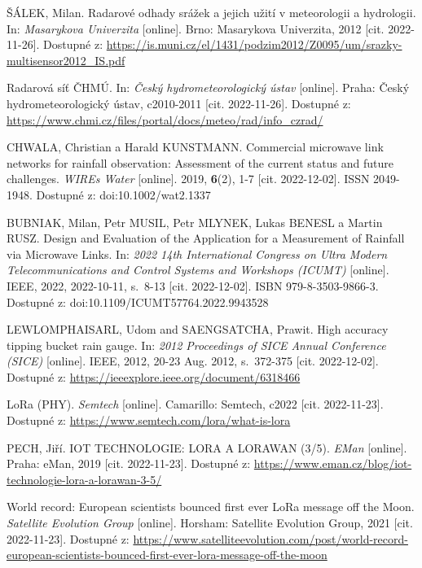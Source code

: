 \begin{thebibliography}{99}
ŠÁLEK, Milan. Radarové odhady srážek a jejich užití v meteorologii a hydrologii. In: \textit{Masarykova Univerzita} [online]. Brno: Masarykova Univerzita, 2012 [cit. 2022-11-26]. Dostupné z: \url{https://is.muni.cz/el/1431/podzim2012/Z0095/um/srazky-multisensor2012\_IS.pdf}

Radarová síť ČHMÚ. In: \textit{Český hydrometeorologický ústav} [online]. Praha: Český hydrometeorologický ústav, c2010-2011 [cit. 2022-11-26]. Dostupné z: \url{https://www.chmi.cz/files/portal/docs/meteo/rad/info\_czrad/}

CHWALA, Christian a Harald KUNSTMANN. Commercial microwave link networks for rainfall observation: Assessment of the current status and future challenges. \textit{WIREs Water} [online]. 2019, \textbf{6}(2), 1-7 [cit. 2022-12-02]. ISSN 2049-1948. Dostupné z: doi:10.1002/wat2.1337

BUBNIAK, Milan, Petr MUSIL, Petr MLYNEK, Lukas BENESL a Martin RUSZ. Design and Evaluation of the Application for a Measurement of Rainfall via Microwave Links. In: \textit{2022 14th International Congress on Ultra Modern Telecommunications and Control Systems and Workshops (ICUMT)} [online]. IEEE, 2022, 2022-10-11, s.~8-13 [cit. 2022-12-02]. ISBN 979-8-3503-9866-3. Dostupné z: doi:10.1109/ICUMT57764.2022.9943528

LEWLOMPHAISARL, Udom and SAENGSATCHA, Prawit. High accuracy tipping bucket rain gauge. In: \textit{2012 Proceedings of SICE Annual Conference (SICE)} [online]. IEEE, 2012, 20-23 Aug. 2012, s.~372-375 [cit. 2022-12-02]. Dostupné z: \url{https://ieeexplore.ieee.org/document/6318466}

LoRa (PHY). \textit{Semtech} [online]. Camarillo: Semtech, c2022 [cit. 2022-11-23]. Dostupné z: \url{https://www.semtech.com/lora/what-is-lora}

PECH, Jiří. IOT TECHNOLOGIE: LORA A LORAWAN (3/5). \textit{EMan} [online]. Praha: eMan, 2019 [cit. 2022-11-23]. Dostupné z: \url{https://www.eman.cz/blog/iot-technologie-lora-a-lorawan-3-5/}

World record: European scientists bounced first ever LoRa message off the Moon. \textit{Satellite Evolution Group} [online]. Horsham: Satellite Evolution Group, 2021 [cit. 2022-11-23]. Dostupné z: \url{https://www.satelliteevolution.com/post/world-record-european-scientists-bounced-first-ever-lora-message-off-the-moon}


\end{thebibliography}
